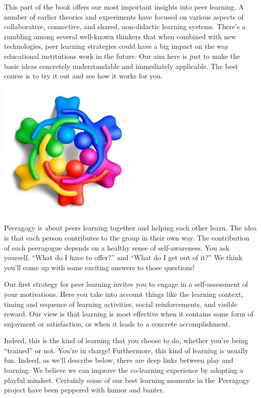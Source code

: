 This part of the book offers our most important insights into peer
learning. A number of earlier theories and experiments have focused on
various aspects of collaborative, connective, and shared, non-didactic
learning systems. There's a rumbling among several well-known thinkers
that when combined with new technologies, peer learning strategies could
have a big impact on the way educational institutions work in the
future. Our aim here is just to make the basic ideas concretely
understandable and immediately applicable. The best course is to try it
out and see how it works for you.

\begin{center}
\includegraphics[width=.4\textwidth]{./pictures/peeragogy-in-action.jpg}
\end{center}

Peeragogy is about peers learning together and helping each other learn.
The idea is that each person contributes to the group in their own way.
The contribution of each peeragogue depends on a healthy sense of
self-awareness. You ask yourself, ``What do I have to offer?'' and
``What do I get out of it?'' We think you'll come up with some exciting
answers to those questions!

Our first strategy for peer learning invites you to engage in a
self-assessment of your motivations. Here you take into account things
like the learning context, timing and sequence of learning activities,
social reinforcements, and visible reward. Our view is that learning is
most effective when it contains some form of enjoyment or satisfaction,
or when it leads to a concrete accomplishment.

Indeed, this is the kind of learning that you choose to do, whether
you're being ``trained'' or not. You're in charge! Furthermore, this
kind of learning is usually fun. Indeed, as we'll describe below, there
are deep links between play and learning. We believe we can improve the
co-learning experience by adopting a playful mindset. Certainly some of
our best learning moments in the~Peeragogy project have been peppered
with humor and banter.

